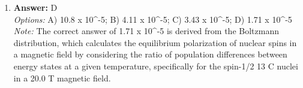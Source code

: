 \documentclass[12pt]{article}
\begin{document}
\begin{enumerate}[label=\arabic*.]
\\ \textit{Note:} A spontaneous process is characterized by an increase in the total entropy of the system and its surroundings, in accordance with the second law of thermodynamics, indicating that natural processes tend to move towards a state of greater disorder or randomness.
\item \textbf{Answer:} D
\\ \textit{Options:} A) 10.8 x 10^-5; B) 4.11 x 10^-5; C) 3.43 x 10^-5; D) 1.71 x 10^-5
\\ \textit{Note:} The correct answer of 1.71 x 10^-5 is derived from the Boltzmann distribution, which calculates the equilibrium polarization of nuclear spins in a magnetic field by considering the ratio of population differences between energy states at a given temperature, specifically for the spin-1/2 13 C nuclei in a 20.0 T magnetic field.
\end{enumerate}
\end{document}

